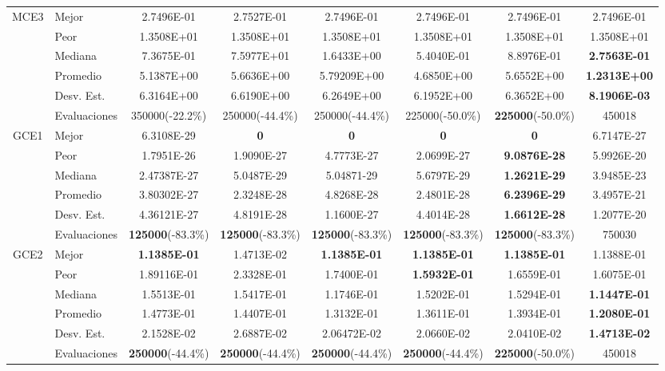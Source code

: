 \begin{table}
{\begin{tabular}{clcccccc}
			\hline
			\multirow{6}{*}{MCE3} & Mejor       & 2.7496E-01    & 2.7527E-01   & 2.7496E-01   &2.7496E-01   & 2.7496E-01    & 2.7496E-01  \\
			& Peor        & 1.3508E+01    & 1.3508E+01   & 1.3508E+01   & 1.3508E+01   & 1.3508E+01   & 1.3508E+01 \\
			& Mediana     & 7.3675E-01   & 7.5977E+01   & 1.6433E+00  & 5.4040E-01   & 8.8976E-01   & \textbf{2.7563E-01}   \\
			& Promedio    & 5.1387E+00   & 5.6636E+00    & 5.79209E+00  & 4.6850E+00   & 5.6552E+00   & \textbf{1.2313E+00} \\
			& Desv. Est.  & 6.3164E+00   & 6.6190E+00    & 6.2649E+00   & 6.1952E+00   & 6.3652E+00   & \textbf{8.1906E-03}  \\
			& Evaluaciones&350000(-22.2\%) &250000(-44.4\%) &250000(-44.4\%)   & 225000(-50.0\%)   & \textbf{225000}(-50.0\%)  & 450018 \\
			
			
			\hline
			\multirow{6}{*}{GCE1} & Mejor       & 6.3108E-29    &\textbf{ 0 }          &\textbf{ 0   }         &\textbf{ 0}            &\textbf{ 0 }           &6.7147E-27 \\
			& Peor        &1.7951E-26    & 1.9090E-27   & 4.7773E-27   & 2.0699E-27   & \textbf{9.0876E-28}  & 5.9926E-20 \\
			& Mediana     &2.47387E-27  & 5.0487E-29   & 5.04871-29   & 5.6797E-29   & \textbf{1.2621E-29}   & 3.9485E-23  \\
			& Promedio    &3.80302E-27   &2.3248E-28    & 4.8268E-28  & 2.4801E-28   &\textbf{ 6.2396E-29 } & 3.4957E-21  \\
			& Desv. Est.  & 4.36121E-27    &4.8191E-28   &	1.1600E-27  & 4.4014E-28   &\textbf{ 1.6612E-28}   & 1.2077E-20  \\
			& Evaluaciones&\textbf{125000}(-83.3\%) &\textbf{125000}(-83.3\%) &\textbf{125000}(-83.3\%)    & \textbf{125000}(-83.3\%)    & \textbf{125000}(-83.3\%)  & 750030\\
			
			
			\hline
			\multirow{6}{*}{GCE2} & Mejor       &\textbf{1.1385E-01}&1.4713E-02&\textbf{	1.1385E-01	}&\textbf{1.1385E-01}&	\textbf{1.1385E-01 }        &1.1388E-01 \\
			& Peor        &1.89116E-01&	2.3328E-01&	1.7400E-01&	\textbf{1.5932E-01}&	1.6559E-01    &1.6075E-01 \\
			& Mediana     &1.5513E-01&	1.5417E-01&	1.1746E-01&	1.5202E-01&	1.5294E-01 & \textbf{1.1447E-01}  \\
			& Promedio    & 1.4773E-01&	1.4407E-01&	1.3132E-01&	1.3611E-01&	1.3934E-01 &\textbf{ 1.2080E-01 } \\
			& Desv. Est.  &2.1528E-02&	2.6887E-02	&2.06472E-02	&2.0660E-02	&2.0410E-02& \textbf{1.4713E-02 }\\
			& Evaluaciones &\textbf{250000}(-44.4\%) &\textbf{250000}(-44.4\%) &\textbf{250000}(-44.4\%)  & \textbf{250000}(-44.4\%)  &\textbf{225000}(-50.0\%)  &  450018 \\
			

\end{tabular}}
\end{table}
